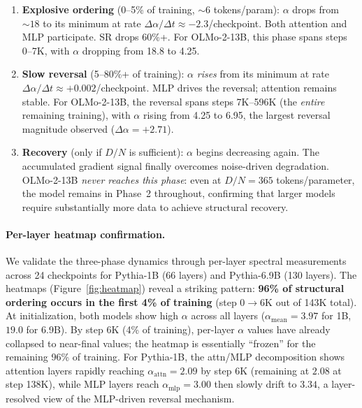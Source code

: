 \begin{enumerate}[leftmargin=*,itemsep=1pt]
    \item \textbf{Explosive ordering} (0--5\% of training, ${\sim}6$ tokens/param): $\alpha$ drops from ${\sim}18$ to its minimum at rate $\Delta\alpha/\Delta t \approx -2.3$/checkpoint. Both attention and MLP participate. SR drops 60\%+. For OLMo-2-13B, this phase spans steps 0--7K, with $\alpha$ dropping from 18.8 to 4.25.

    \item \textbf{Slow reversal} (5--80\%+ of training): $\alpha$ \emph{rises} from its minimum at rate $\Delta\alpha/\Delta t \approx +0.002$/checkpoint. MLP drives the reversal; attention remains stable. For OLMo-2-13B, the reversal spans steps 7K--596K (the \emph{entire} remaining training), with $\alpha$ rising from 4.25 to 6.95, the largest reversal magnitude observed ($\Delta\alpha = +2.71$).

    \item \textbf{Recovery} (only if $D/N$ is sufficient): $\alpha$ begins decreasing again. The accumulated gradient signal finally overcomes noise-driven degradation. OLMo-2-13B \emph{never reaches this phase}: even at $D/N = 365$ tokens/parameter, the model remains in Phase~2 throughout, confirming that larger models require substantially more data to achieve structural recovery.
\end{enumerate}

\paragraph{Per-layer heatmap confirmation.} We validate the three-phase dynamics through per-layer spectral measurements across 24 checkpoints for Pythia-1B (66 layers) and Pythia-6.9B (130 layers). The heatmaps (Figure~\ref{fig:heatmap}) reveal a striking pattern: \textbf{96\% of structural ordering occurs in the first 4\% of training} (step 0$\to$6K out of 143K total). At initialization, both models show high $\alpha$ across all layers ($\alpha_{\mathrm{mean}} = 3.97$ for 1B, $19.0$ for 6.9B). By step 6K (4\% of training), per-layer $\alpha$ values have already collapsed to near-final values; the heatmap is essentially ``frozen'' for the remaining 96\% of training. For Pythia-1B, the attn/MLP decomposition shows attention layers rapidly reaching $\alpha_{\mathrm{attn}} = 2.09$ by step 6K (remaining at $2.08$ at step 138K), while MLP layers reach $\alpha_{\mathrm{mlp}} = 3.00$ then slowly drift to $3.34$, a layer-resolved view of the MLP-driven reversal mechanism.

